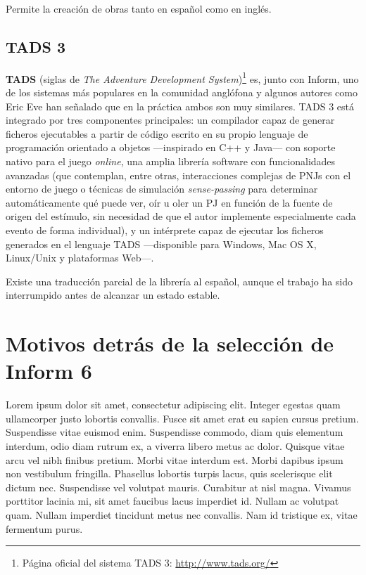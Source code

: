 Permite la creación de obras tanto en español como en inglés.

\subsection{TADS 3}

\textbf{TADS} (siglas de \emph{The Adventure Development System})\footnote{Página oficial del sistema TADS 3: \url{http://www.tads.org/}} es, junto con Inform, uno de los sistemas más populares en la comunidad anglófona y algunos autores como Eric Eve han señalado que en la práctica ambos son muy similares\cite{Eve:2009}. TADS 3 está integrado por tres componentes principales: un compilador capaz de generar ficheros ejecutables a partir de código escrito en su propio lenguaje de programación orientado a objetos ---inspirado en C++ y Java--- con soporte nativo para el juego \emph{online}, una amplia librería software con funcionalidades avanzadas (que contemplan, entre otras, interacciones complejas de PNJs con el entorno de juego o técnicas de simulación \emph{sense-passing} para determinar automáticamente qué puede ver, oír u oler un PJ en función de la fuente de origen del estímulo, sin necesidad de que el autor implemente especialmente cada evento de forma individual), y un intérprete capaz de ejecutar los ficheros generados en el lenguaje TADS ---disponible para Windows, Mac OS X, Linux/Unix y plataformas Web---.

Existe una traducción parcial de la librería al español, aunque el trabajo ha sido interrumpido antes de alcanzar un estado estable.


\section{Motivos detrás de la selección de Inform 6}

Lorem ipsum dolor sit amet\cite{Stanley:1970}, consectetur adipiscing elit. Integer egestas quam ullamcorper justo lobortis convallis. Fusce sit amet erat eu sapien cursus pretium. Suspendisse vitae euismod enim. Suspendisse commodo, diam quis elementum interdum, odio diam rutrum ex, a viverra libero metus ac dolor. Quisque vitae arcu vel nibh finibus pretium. Morbi vitae interdum est. Morbi dapibus ipsum non vestibulum fringilla. Phasellus lobortis turpis lacus, quis scelerisque elit dictum nec. Suspendisse vel volutpat mauris. Curabitur at nisl magna. Vivamus porttitor lacinia mi, sit amet faucibus lacus imperdiet id. Nullam ac volutpat quam. Nullam imperdiet tincidunt metus nec convallis. Nam id tristique ex, vitae fermentum purus.

